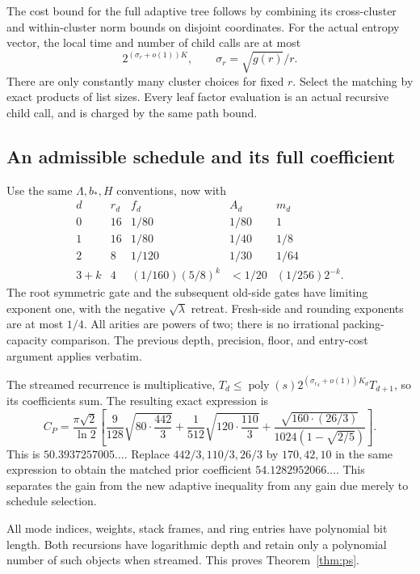 \documentclass[11pt,letterpaper]{article}
\theoremstyle{remark}\newtheorem{remark}[theorem]{Remark}
\newcommand{\poly}{\operatorname{poly}}
\begin{document}
The cost bound for the full adaptive tree follows by combining its
cross-cluster and within-cluster norm bounds on disjoint coordinates.
For the actual entropy vector, the local time and number of child calls
are at most
\[
 2^{(\sigma_r+o(1))K},\qquad \sigma_r=\sqrt{g(r)}/r.
\]
There are only constantly many cluster choices for fixed $r$. Select the
matching by exact products of list sizes. Every leaf factor evaluation
is an actual recursive child call, and is charged by the same path bound.

\subsection{An admissible schedule and its full coefficient}

Use the same $\Lambda,b_*,H$ conventions, now with
\[
\begin{array}{c|c|c|c|c}
d&r_d&f_d&A_d&m_d\\\hline
0&16&1/80&1/80&1\\
1&16&1/80&1/40&1/8\\
2&8&1/120&1/30&1/64\\
3+k&4&(1/160)(5/8)^k&<1/20&(1/256)2^{-k}.
\end{array}
\]
The root symmetric gate and the subsequent old-side gates have limiting
exponent one, with the negative $\sqrt\lambda$ retreat. Fresh-side and
rounding exponents are at most $1/4$. All arities are powers of two;
there is no irrational packing-capacity comparison. The previous depth,
precision, floor, and entry-cost argument applies verbatim.

The streamed recurrence is multiplicative,
$T_d\le\poly(s)2^{(\sigma_{r_d}+o(1))K_d}T_{d+1}$, so its coefficients
sum. The resulting exact expression is
\begin{equation}\label{eq:ps-constant}
 C_P=\frac{\pi\sqrt2}{\ln2}
 \left[
 \frac9{128}\sqrt{80\cdot\frac{442}3}
 +\frac1{512}\sqrt{120\cdot\frac{110}3}
 +\frac{\sqrt{160\cdot(26/3)}}{1024(1-\sqrt{2/5})}
 \right].
\end{equation}
This is $50.3937257005\ldots$. Replace $442/3,110/3,26/3$ by
$170,42,10$ in the same expression to obtain the matched prior coefficient
$54.1282952066\ldots$. This separates the gain from the new adaptive
inequality from any gain due merely to schedule selection.

All mode indices, weights, stack frames, and ring entries have polynomial
bit length. Both recursions have logarithmic depth and retain only a
polynomial number of such objects when streamed. This proves
Theorem~\ref{thm:ps}.
\end{document}
